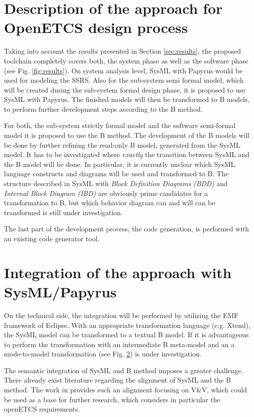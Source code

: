 \section{Description of the approach for OpenETCS design process}

Taking into account the results presented in Section
\ref{sec:results}, the proposed toolchain completely covers both, the
system phase as well as the software phase (see
Fig. \ref{fig:results}). On system analysis level, SysML with Papyrus
would be used for modeling the SSRS. Also for the sub-system semi
formal model, which will be created during the sub-system formal
design phase, it is proposed to use SysML with Papyrus. The finished
models will then be transformed to B models, to perform further
development steps according to the B method.

For both, the sub-system strictly formal model and the software
semi-formal model it is proposed to use the B method. The development
of the B models will be done by further refining the read-only B
model, generated from the SysML model. It has to be investigated where
\emph{exactly} the transition between SysML and the B model will be
done. In particular, it is currently unclear which SysML language
constructs and diagrams will be used and transformed to B. The
structure described in SysML with \emph{Block Definition Diagrams
  (BDD)} and \emph{Internal Block Diagram (IBD)} are obviously prime
candidates for a transformation to B, but which behavior diagram can
and will can be transformed is still under investigation.

The last part of the development process, the code generation, is
performed with an existing code generator tool.

\section{Integration of the approach with SysML/Papyrus}

On the technical side, the integration will be performed by utilizing
the EMF framework of Eclipse. With an appropriate transformation
language (e.g. Xtend), the SysML model can be transformed to a textual
B model. If it is advantageous to perform the transformation with an
intermediate B meta-model and an a mode-to-model transformation (see
Fig. \ref{}) is under investigation.

The semantic integration of SysML and B method imposes a greater
challenge. There already exist literature regarding the alignment of
SysML and the B method. The work in \cite{} provides such an alignment
focusing on V\&V, which could be used as a base for further research,
which considers in particular the openETCS requirements.


